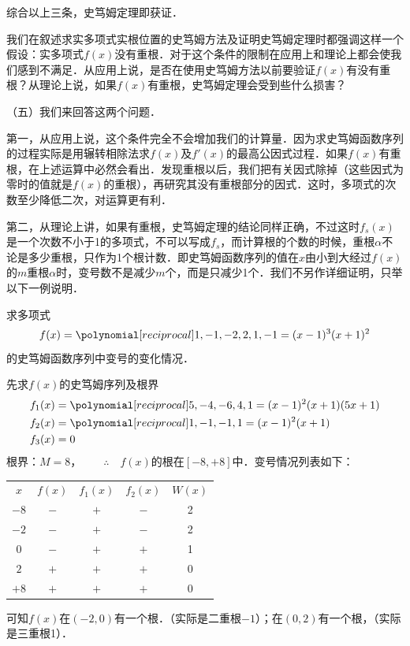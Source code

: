 综合以上三条，史笃姆定理即获证．

我们在叙述求实多项式实根位置的史笃姆方法及证明史笃姆定理时都强调这样一个假设：实多项式$f(x)$没有重根．对于这个条件的限制在应用上和理论上都会使我们感到不满足．从应用上说，是否在使用史笃姆方法以前要验证$f(x)$有没有重根？从理论上说，如果$f(x)$有重根，史笃姆定理会受到些什么损害？

（五）我们来回答这两个问题．

第一，从应用上说，这个条件完全不会增加我们的计算量．因为求史笃姆函数序列的过程实际是用辗转相除法求$f(x)$及$f'(x)$的最高公因式过程．如果$f(x)$有重根，在上述运算中必然会看出．发现重根以后，我们把有关因式除掉（这些因式为零时的值就是$f(x)$的重根），再研究其没有重根部分的因式．这时，多项式的次数至少降低二次，对运算更有利．

第二，从理论上讲，如果有重根，史笃姆定理的结论同样正确，不过这时$f_s(x)$是一个次数不小于1的多项式，不可以写成$f_s$，而计算根的个数的时候，重根$\alpha$不论是多少重根，只作为1个根计数．即史笃姆函数序列的值在$x$由小到大经过$f(x)$的$m$重根$\alpha$时，变号数不是减少$m$个，而是只减少1个．我们不另作详细证明，只举以下一例说明．

\begin{example}
求多项式
\[f(x)=\poly{1,-1,-2,2,1,-1}=(x-1)^3(x+1)^2\]
的史笃姆函数序列中变号的变化情况．
\end{example}

\begin{solution}
先求$f(x)$的史笃姆序列及根界
\[\begin{split}
    f_1(x)&=\poly{5,-4,-6,4,1}=(x-1)^2(x+1)(5x+1)\\
    f_2(x)&=\poly{1,-1,-1,1}=(x-1)^2(x+1)\\
    f_3(x)&=0
\end{split}
    \]
根界：$M=8$，$\qquad \therefore\quad f(x)$的根在$[-8,+8]$中．变号情况列表如下：
\begin{center}
    \begin{tabular}{ccccc}
$x$ & $f(x)$ & $f_1(x)$ & $f_2(x)$ &  $W(x)$\\
$-8$ & $-$ & $+$ &$-$&2\\
$-2$ &$-$ & $+$ &$-$&2\\
$0$ & $-$ & $+$ &$+$&1\\
$2$ &  $+$ & $+$ &$+$&0\\
$+8$ &  $+$ & $+$ &$+$&0\\
    \end{tabular}
\end{center}

可知$f(x)$在$(-2, 0)$有一个根．（实际是二重根$-1$）；在$(0, 2)$有一个根，（实际是三重根1）．
\end{solution}

